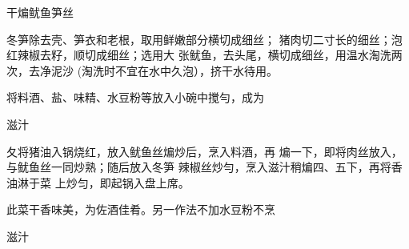 \begin{recipe}{干煸鱿鱼笋丝}

\ingredients


\cooking

\step 冬笋除去壳、笋衣和老根，取用鲜嫩部分横切成细丝； 猪肉切二寸长的细丝；泡红辣椒去籽，顺切成细丝；选用大 张鱿鱼，去头尾，横切成细丝，用温水淘洗两次，去净泥沙 (淘洗时不宜在水中久泡），挤干水待用。

\step 将料酒、盐、味精、水豆粉等放入小碗中搅勻，成为

滋汁

夂将猪油入锅烧红，放入鱿鱼丝煸炒后，烹入料酒，再 煸一下，即将肉丝放入，与鱿鱼丝一同炒熟；随后放入冬笋 辣椒丝炒勻，烹入滋汁稍煸四、五下，再将香油淋于菜 上炒匀，即起锅入盘上席。

\notes

此菜干香味美，为佐酒佳肴。另一作法不加水豆粉不烹

滋汁

\end{recipe}

